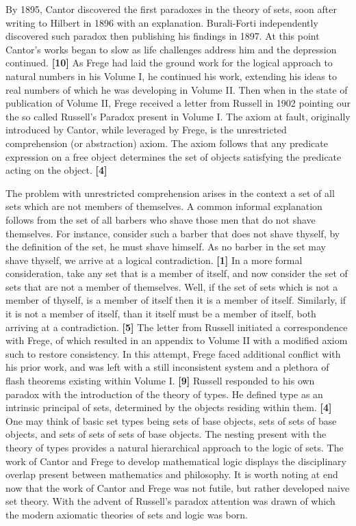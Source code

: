 \documentclass[12pt]{article}
\begin{document}
\hspace{5mm}
By 1895, Cantor discovered the first paradoxes in the theory of sets, soon after writing to Hilbert in 1896 with an explanation.
Burali-Forti independently discovered such paradox then publishing his findings in 1897.
At this point Cantor's works began to slow as life challenges address him and the depression continued. \textbf{[10]}
As Frege had laid the ground work for the logical approach to natural numbers in his Volume I, he continued his work, extending his ideas to real numbers of which he was developing in Volume II.
Then when in the state of publication of Volume II, Frege received a letter from Russell in 1902 pointing our the so called Russell's Paradox present in Volume I.
The axiom at fault, originally introduced by Cantor, while leveraged by Frege, is the unrestricted comprehension (or abstraction) axiom.
The axiom follows that any predicate expression on a free object determines the set of objects satisfying the predicate acting on the object. \textbf{[4]}

\hspace{5mm}
The problem with unrestricted comprehension arises in the context a set of all sets which are not members of themselves.
A common informal explanation follows from the set of all barbers who shave those men that do not shave themselves.
For instance, consider such a barber that does not shave thyself, by the definition of the set, he must shave himself.
As no barber in the set may shave thyself, we arrive at a logical contradiction. \textbf{[1]}
In a more formal consideration, take any set that is a member of itself, and now consider the set of sets that are not a member of themselves.
Well, if the set of sets which is not a member of thyself, is a member of itself then it is a member of itself.
Similarly, if it is not a member of itself, than it itself must be a member of itself, both arriving at a contradiction. \textbf{[5]}
The letter from Russell initiated a correspondence with Frege, of which resulted in an appendix to Volume II with a modified axiom such to restore consistency.
In this attempt, Frege faced additional conflict with his prior work, and was left with a still inconsistent system and a plethora of flash theorems existing within Volume I. \textbf{[9]}
Russell responded to his own paradox with the introduction of the theory of types.
He defined type as an intrinsic principal of sets, determined by the objects residing within them. \textbf{[4]}
One may think of basic set types being sets of base objects, sets of sets of base objects, and sets of sets of sets of base objects.
The nesting present with the theory of types provides a natural hierarchical approach to the logic of sets.
The work of Cantor and Frege to develop mathematical logic displays the disciplinary overlap present between mathematics and philosophy.
It is worth noting at end now that the work of Cantor and Frege was not futile, but rather developed naive set theory.
With the advent of Russell's paradox attention was drawn of which the modern axiomatic theories of sets and logic was born.
\end{document}

